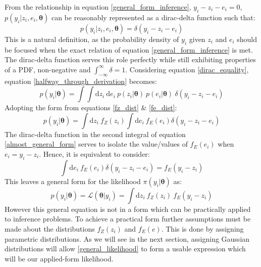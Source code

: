 From the relationship in equation \ref{general_form_inference}, $y_i-z_i-e_i = 0$, $p(y_i|z_i,e_i,\bm{\theta})$ can be reasonably represented as a dirac-delta function such that:
\begin{equation}
p(y_i|z_i,e_i,\bm{\theta}) = \delta(y_i-z_i-e_i)
\label{dirac_equality}
\end{equation}
This is a natural definition, as the probability density of $y_i$ given $z_i$ and $e_i$ should be focused when the exact relation of equation \ref{general_form_inference} is met. The dirac-delta function serves this role perfectly while still exhibiting properties of a PDF, non-negative and $\int_{-\infty}^{\infty}\delta = 1$. Considering equation \ref{dirac_equality}, equation \ref{halfway_through_derivation} becomes:
\begin{equation}
p(y_i|\bm{\theta}) = \int \int \text{d}z_i\ \text{d}e_i\ p(z_i|\bm{\theta})\ p(e_i|\bm{\theta})\ \delta(y_i-z_i-e_i)
\end{equation}
Adopting the form from equations \ref{fz_dist} \& \ref{fe_dist}:
\begin{equation}
p(y_i|\bm{\theta}) = \int \text{d}z_i\ f_Z(z_i) \int \text{d}e_i\ f_E(e_i) \delta(y_i-z_i-e_i)
\label{almost_general_form}
\end{equation}
The dirac-delta function in the second integral of equation \ref{almost_general_form} serves to isolate the value/values of $f_E(e_i)$ when $e_i = y_i - z_i$. Hence, it is equivalent to consider:
\begin{equation}
\int \text{d}e_i\ f_E(e_i) \delta(y_i-z_i-e_i) = f_E(y_i - z_i)
\end{equation}
This leaves a general form for the likelihood $\pi(y_i|\bm{\theta})$ as: 
\begin{equation}
p(y_i|\bm{\theta}) = \mathcal{L}(\bm{\theta}|y_i) = \int \text{d}z_i\ f_Z(z_i)\ f_E(y_i - z_i)
\label{general_likelihood}
\end{equation}
However this general equation is not in a form which can be practically applied to inference problems. To achieve a practical form further assumptions must be made about the distributions $f_Z(z_i)$ and $f_E(e)$. This is done by assigning parametric distributions. As we will see in the next section, assigning Gaussian distributions will allow \ref{general_likelihood} to form a usable expression which will be our applied-form likelihood.

